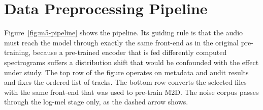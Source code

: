 \documentclass{FastFyp}
\begin{document}
\section{Data Preprocessing Pipeline}
\label{sec:m5-prep}
Figure~\ref{fig:m5-pipeline} shows the pipeline. Its guiding rule is that the audio must reach the model through exactly the same front-end as in the original pre-training, because a pre-trained encoder that is fed differently computed spectrograms suffers a distribution shift that would be confounded with the effect under study. The top row of the figure operates on metadata and audit results and fixes the ordered list of tracks. The bottom row converts the selected files with the same front-end that was used to pre-train M2D. The noise corpus passes through the log-mel stage only, as the dashed arrow shows.
\end{document}
